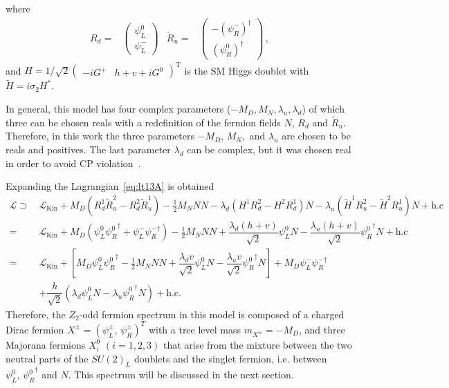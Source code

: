 where
\begin{align}\label{eq:weyl-doublets}
  R_{d}=&
  \begin{pmatrix}
    \psi_{L}^{0}\\
    \psi_{L}^{-}
  \end{pmatrix}
&  
\widetilde{R}_{u}=&
  \begin{pmatrix}
   - \left( \psi_{R}^{-} \right)^{\dagger}\\
     \left(\psi_{R}^{0}\right)^{\dagger}
  \end{pmatrix}\,,
\end{align}
and $H=1/\sqrt{2} \begin{pmatrix}-iG^+ & h+v+iG^0\end{pmatrix}^{\operatorname{T}}$ is the SM Higgs doublet with $\widetilde{H}=i\sigma_2H^*$. 

In general, this model has four complex parameters ($-M_D, M_N, \lambda_u, \lambda_d$) of which
three  can be chosen reals with a redefinition of the fermion fields $N$, $R_d$ and $\widetilde{R}_{u}$. 
Therefore, in this work the three parameters  $-M_D$, $M_N,$ and $\lambda_u$ are chosen to be reals and positives. 
The last parameter $\lambda_d$ can be complex, but it was chosen real in order to avoid CP violation~\cite{Abe:2014gua}. 

Expanding the Lagrangian~\eqref{eq:lt13A} is obtained
\begin{align}
\label{eq:lt13a-expanded}
\mathcal{L}  \supset \, & \mathcal{L}_{\text{Kin}}+M_D(R_d^1\widetilde{R}_u^2-R_d^2\widetilde{R}_u^1)-\tfrac{1}{2}M_N NN
-\lambda_d(H^1R_d^2-H^2R_d^1)N-\lambda_u(\widetilde{H}^1R_u^2-\widetilde{H}^2R_u^1)N+\text{h.c}\nonumber \\
=\,& \mathcal{L}_{\text{Kin}}+M_D(\psi_L^0{\psi_{R}^0 }^{\dagger}+\psi_L^-{\psi_{R}^- }^{\dagger})-\tfrac{1}{2}M_N NN
+\dfrac{\lambda_d (h+v)}{\sqrt{2}}\psi_L^0N - \dfrac{\lambda_u (h+v)}{\sqrt{2}}{\psi_R^0}^{\dagger}N +\text{h.c}\nonumber\\
=\,& \mathcal{L}_{\text{Kin}}+\left[M_D\psi_L^0{\psi_{R}^0 }^{\dagger}-\tfrac{1}{2}M_N NN + \dfrac{\lambda_d v}{\sqrt{2}}\psi_L^0N - \dfrac{\lambda_u v}{\sqrt{2}}{\psi_R^0}^{\dagger}N\right]
+ M_D\psi_L^-{\psi_{R}^- }^{\dagger}
\nonumber\\ & 
+ \dfrac{h}{\sqrt{2}}\left(\lambda_d\psi_L^0N - \lambda_u{\psi_R^0}^{\dagger}N\right)+\text{h.c}.
%
\end{align}
%
Therefore, the $Z_2$-odd fermion spectrum in this model is composed of a
charged Dirac fermion $X^{\pm}=(\psi^{\pm}_L,\, \psi^{\pm}_R)^T$ with a tree
level mass $m_{X^\pm}=-M_D$, and three Majorana fermions $X_i^0$ $(i=1,2,3)$ that arise from
the mixture between the two neutral parts of the $SU(2)_L$ doublets and
the singlet fermion, i.e. between $\psi_L^0, \, {\psi_R^0}^{\dagger}$ and $N$. This spectrum will be discussed in the next section.







